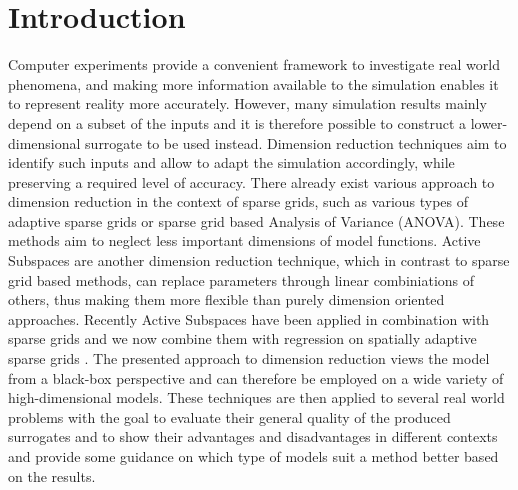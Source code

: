 \documentclass[
  a4paper,  %
  twoside,  %
  bibliography=totoc,
  headsepline,
  cleardoublepage=empty,
  parskip=half,
  draft=false
]{scrbook}
\begin{document}


\renewcommand*{\chapterpagestyle}{scrplain}
\pagestyle{scrheadings}
\pagestyle{scrheadings}
\ihead[]{}
\chead[]{}
\ohead[]{\headmark}
\cfoot[]{}
\ifoot[]{}

































%
%


\chapter{Introduction}
\label{chap:c1}

\setcounter{page}{1}

Computer experiments provide a convenient framework to investigate real world phenomena, and making more information available to the simulation enables it to represent reality more accurately.
However, many simulation results mainly depend on a subset of the inputs and it is therefore possible to construct a lower-dimensional surrogate to be used instead.
Dimension reduction techniques aim to identify such inputs and allow to adapt the simulation accordingly, while preserving a required level of accuracy.
There already exist various approach to dimension reduction in the context of sparse grids, such as various types of adaptive sparse grids or sparse grid based Analysis of Variance (ANOVA).
These methods aim to neglect less important dimensions of model functions.
Active Subspaces \cite{Constantine2014} are another dimension reduction technique, which in contrast to sparse grid based methods, can replace parameters through linear combiniations of others, thus making them more flexible than purely dimension oriented approaches.
Recently Active Subspaces have been applied in combination with sparse grids and we now combine them with regression on spatially adaptive sparse grids \cite{P10}.
The presented approach to dimension reduction views the model from a black-box perspective and can therefore be employed on a wide variety of high-dimensional models.
These techniques are then applied to several real world problems with the goal to evaluate their general quality of the produced surrogates and to show their advantages and disadvantages in different contexts and provide some guidance on which type of models suit a method better based on the results.
\end{document}
